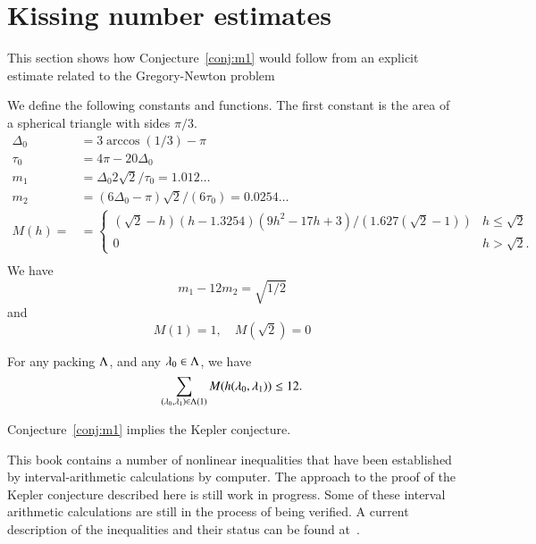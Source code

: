 \section{Kissing number estimates}

This section shows how Conjecture~\ref{conj:m1} would follow from an explicit estimate
related to the Gregory-Newton problem


We define the following constants and functions.  The first constant
is the area of a spherical triangle with sides $\pi/3$.
$$
\begin{array}{lll}
\Delta_0 &= 3\arccos(1/3)-\pi\\
\tau_0 &= 4\pi - 20\Delta_0\\
m_1 &= \Delta_0 2\sqrt2/\tau_0 = 1.012\ldots \\ %
m_2  &= (6\Delta_0- \pi)\sqrt2/(6 \tau_0) = 0.0254\ldots\\ %
M(h) = &=
\begin{cases}
 (\sqrt2-h) (h-1.3254) (9h^2 - 17 h + 3)/(1.627 (\sqrt2-1))& h\le\sqrt2\\
 0 & h >\sqrt2.
\end{cases}
\\
\end{array}
$$
We have 
\begin{equation}\label{eqn:km}m_1 - 12m_2 = \sqrt{1/2}\end{equation}
and
\begin{equation}M(1) = 1,\quad M(\sqrt2) =0\end{equation}


\begin{conjecture}[Marchal]\label{conj:m1} For any packing $\Lambda$, and
any $\lambda_0\in\Lambda$, we have
$$
\sum_{(\lambda_0,\lambda_1)\in\Lambda(1)} M(h(\lambda_0,\lambda_1)) \le 12.
$$
\end{conjecture}

\begin{theorem}\label{theorem:mk1}
Conjecture~\ref{conj:m1} implies the Kepler conjecture.
\end{theorem}

\begin{note}%
This book contains a number of nonlinear inequalities that have been established by interval-arithmetic calculations by computer.  The approach to the proof of the Kepler conjecture described here is still work in progress.  Some of these interval arithmetic calculations are still in the process of being verified.  A current description of the inequalities and their status can be found at~\cite{hales:2009:nonlinear}.
\end{note}

